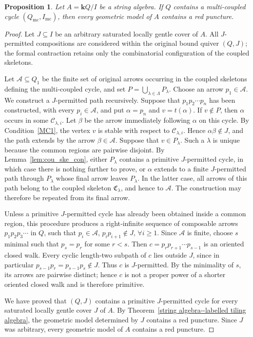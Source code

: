 \documentclass[11pt]{amsart}
\numberwithin{equation}{section}
\newtheorem{proposition}[theorem]{Proposition}
\theoremstyle{definition}
\begin{document}
\begin{proposition}\label{prop:multi_coupled}
Let \(A=\mathbf{k}Q/I\) be a string algebra. If \(Q\) contains a
multi-coupled cycle \((Q_{\mathrm{mc}},I_{\mathrm{mc}})\), then every
geometric model of \(A\) contains a red puncture.
\end{proposition}

\begin{proof}
Let \(J\subseteq I\) be an arbitrary saturated locally gentle cover of \(A\). All \(J\)-permitted compositions are considered within the original bound quiver \((Q,J)\); the formal contraction retains only the combinatorial configuration of the coupled skeletons.

Let \(\mathscr A\subseteq Q_1\) be the finite set of original arrows occurring in the coupled skeletons defining the multi‑coupled cycle, and set \(P=\bigcup_{\lambda\in\Lambda}P_\lambda\). Choose an arrow \(p_1\in\mathscr A\). We construct a \(J\)-permitted path recursively. Suppose that \(p_1p_2\cdots p_n\) has been constructed, with every \(p_i\in\mathscr A\), and put \(\alpha=p_n\) and \(v=t(\alpha)\). If \(v\notin P\), then \(\alpha\) occurs in some \(\mathcal C_{\lambda,i}\). Let \(\beta\) be the arrow immediately following \(\alpha\) on this cycle. By Condition~\ref{MC1}, the vertex \(v\) is stable with respect to \(\mathcal C_{\lambda,i}\). Hence \(\alpha\beta\notin J\), and the path extends by the arrow \(\beta\in\mathscr A\). Suppose that \(v\in P_\lambda\). Such a \(\lambda\) is unique because the common regions are pairwise disjoint. By Lemma~\ref{lem:cou_ske_con}, either \(P_\lambda\) contains a primitive \(J\)-permitted cycle, in which case there is nothing further to prove, or \(\alpha\) extends to a finite \(J\)-permitted path through \(P_\lambda\) whose final arrow leaves \(P_\lambda\). In the latter case, all arrows of this path belong to the coupled skeleton \(\mathfrak C_\lambda\), and hence to \(\mathscr A\). The construction may therefore be repeated from its final arrow.

Unless a primitive \(J\)-permitted cycle has already been obtained inside a common region, this procedure produces a right‑infinite sequence of composable arrows $p_1p_2p_3\cdots$ in \(Q\), such that
$p_i\in\mathscr A$, $p_ip_{i+1}\notin J$, $ \forall i\geq1$. Since \(\mathscr A\) is finite, choose \(s\) minimal such that \(p_s=p_r\) for some \(r<s\). Then $c=p_rp_{r+1}\cdots p_{s-1}$ is an oriented closed walk. Every cyclic length‑two subpath of \(c\) lies outside \(J\), since in particular $p_{s-1}p_r=p_{s-1}p_s\notin J$. Thus \(c\) is \(J\)-permitted. By the minimality of \(s\), its arrows are pairwise distinct; hence \(c\) is not a proper power of a shorter oriented closed walk and is therefore primitive.

We have proved that \((Q,J)\) contains a primitive \(J\)-permitted cycle for every saturated locally gentle cover \(J\) of \(A\). By Theorem~\ref{string algebra--labelled tiling algebra}, the geometric model determined by \(J\) contains a red puncture. Since \(J\) was arbitrary, every geometric model of \(A\) contains a red puncture.
\end{proof}
\end{document}

